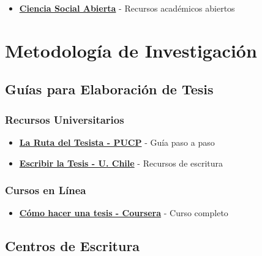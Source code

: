 \documentclass[
  jou,
  floatsintext,
  longtable,
  a4paper,
  nolmodern,
  notxfonts,
  notimes,
  12pt,
  colorlinks=true,linkcolor=blue,citecolor=blue,urlcolor=blue]{apa7}
\providecommand{\tightlist}{%
  \setlength{\itemsep}{0pt}\setlength{\parskip}{0pt}}
\begin{document}
\begin{itemize}
\tightlist
\item
  \textbf{\href{https://cienciasocialabierta.netlify.app/}{Ciencia
  Social Abierta}} - Recursos académicos abiertos
\end{itemize}

\section{Metodología de
Investigación}\label{metodologuxeda-de-investigaciuxf3n}

\subsection{Guías para Elaboración de
Tesis}\label{guuxedas-para-elaboraciuxf3n-de-tesis}

\subsubsection{Recursos Universitarios}\label{recursos-universitarios}

\begin{itemize}
\tightlist
\item
  \textbf{\href{https://posgrado.pucp.edu.pe/informacion-para-estudiantes/la-ruta-del-tesista/}{La
  Ruta del Tesista - PUCP}} - Guía paso a paso
\item
  \textbf{\href{https://aprendizaje.uchile.cl/recursos-para-leer-escribir-y-hablar-en-la-universidad/escribir-la-tesis/}{Escribir
  la Tesis - U. Chile}} - Recursos de escritura
\end{itemize}

\subsubsection{Cursos en Línea}\label{cursos-en-luxednea}

\begin{itemize}
\tightlist
\item
  \textbf{\href{https://www.coursera.org/learn/como-hacer-una-tesis}{Cómo
  hacer una tesis - Coursera}} - Curso completo
\end{itemize}

\subsection{Centros de Escritura}\label{centros-de-escritura}
\end{document}
